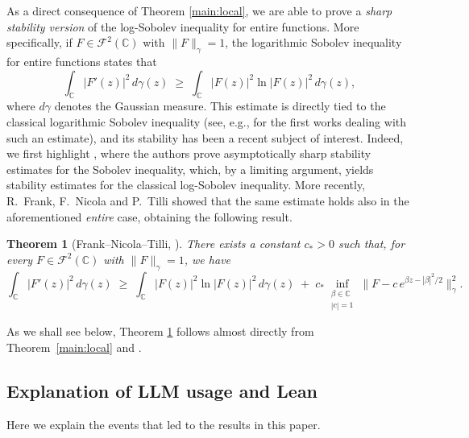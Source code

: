 \documentclass[11pt]{amsart}
\newtheorem{theorem}{Theorem}[section]
\theoremstyle{remark}
\begin{document}
As a direct consequence of Theorem \ref{main:local}, we are able to prove a \emph{sharp stability version} of the log-Sobolev inequality for entire functions. More specifically, if $F \in \mathcal{F}^2(\mathbb{C})$ with $\|F\|_{\gamma}= 1$, the logarithmic Sobolev inequality for entire functions states that 
\[
 \int_{\mathbb{C}} |F'(z)|^2 \, d\gamma(z)
  \;\ge\;
  \int_{\mathbb{C}} |F(z)|^2 \ln |F(z)|^2 \, d\gamma(z),
\]
where $d\gamma$ denotes the Gaussian measure. This estimate is directly tied to the classical logarithmic Sobolev inequality (see, e.g., \cite{Gross1975,Stam1959,Weissler1978} for the first works dealing with such an estimate), and its stability has been a recent subject of interest. Indeed, we first highlight \cite{DolbeaultEstebanFigalliFrankLoss2025}, where the authors prove asymptotically sharp stability estimates for the Sobolev inequality, which, by a limiting argument, yields stability estimates for the classical log-Sobolev inequality. More recently, R.~Frank, F.~Nicola and P.~Tilli \cite{FrankNicolaTilli2025} showed that the same estimate holds also in the aforementioned \emph{entire} case, obtaining the following result. 
\begin{theorem}[Frank--Nicola--Tilli, {\cite[Theorem~14]{FrankNicolaTilli2025}}]\label{thm:FNTLogSob}
There exists a constant $c_\ast > 0$ such that, for every
$F \in \mathcal{F}^2(\mathbb{C})$ with $\|F\|_{\gamma} = 1$, we have
\begin{equation*}
  \int_{\mathbb{C}} |F'(z)|^2 \, d\gamma(z)
  \;\ge\;
  \int_{\mathbb{C}} |F(z)|^2 \ln |F(z)|^2 \, d\gamma(z)
  \;+\;
  c_\ast \!\!\inf_{\substack{\beta \in \mathbb{C} \\ |c|=1}}\!
  \bigl\| F - c\, e^{\beta z - |\beta|^2/2} \bigr\|_{\gamma}^{2}.
\end{equation*}

\end{theorem}

As we shall see below, Theorem \ref{thm:FNTLogSob} follows almost directly from Theorem~\ref{main:local} and \cite[Corollary~1.2]{DolbeaultEstebanFigalliFrankLoss2025}. 


\subsection{Explanation of LLM usage and Lean}\label{LLM Sect}
Here we explain the events that led to the results in this paper.
 \vspace{0.5em}
\end{document}
